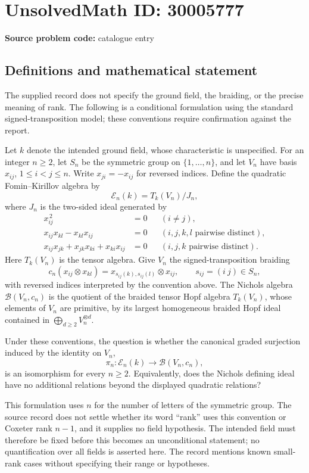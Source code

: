 \documentclass[11pt]{article}
\begin{document}
\section*{UnsolvedMath ID: 30005777}
\textbf{Source problem code:} catalogue entry
\subsection{Definitions and mathematical statement}
The supplied record does not specify the ground field, the braiding, or the precise meaning of rank. The following is a conditional formulation using the standard signed-transposition model; these conventions require confirmation against the report.

Let \(k\) denote the intended ground field, whose characteristic is unspecified. For an integer \(n\geq 2\), let \(S_n\) be the symmetric group on \(\{1,\ldots,n\}\), and let \(V_n\) have basis \(x_{ij}\), \(1\leq i<j\leq n\). Write \(x_{ji}=-x_{ij}\) for reversed indices. Define the quadratic Fomin--Kirillov algebra by
\[
\mathcal E_n(k)=T_k(V_n)/J_n,
\]
where \(J_n\) is the two-sided ideal generated by
\[
\begin{aligned}
 x_{ij}^{\,2}&=0 &&(i\ne j),\\
 x_{ij}x_{kl}-x_{kl}x_{ij}&=0 &&(i,j,k,l\text{ pairwise distinct}),\\
 x_{ij}x_{jk}+x_{jk}x_{ki}+x_{ki}x_{ij}&=0 &&(i,j,k\text{ pairwise distinct}).
\end{aligned}
\]
Here \(T_k(V_n)\) is the tensor algebra. Give \(V_n\) the signed-transposition braiding
\[
 c_n(x_{ij}\otimes x_{kl})
 =x_{s_{ij}(k),s_{ij}(l)}\otimes x_{ij},
 \qquad s_{ij}=(i\ j)\in S_n,
\]
with reversed indices interpreted by the convention above. The Nichols algebra \(\mathcal B(V_n,c_n)\) is the quotient of the braided tensor Hopf algebra \(T_k(V_n)\), whose elements of \(V_n\) are primitive, by its largest homogeneous braided Hopf ideal contained in \(\bigoplus_{d\geq2}V_n^{\otimes d}\).

Under these conventions, the question is whether the canonical graded surjection induced by the identity on \(V_n\),
\[
\pi_n:\mathcal E_n(k)\longrightarrow\mathcal B(V_n,c_n),
\]
is an isomorphism for every \(n\geq2\). Equivalently, does the Nichols defining ideal have no additional relations beyond the displayed quadratic relations?

This formulation uses \(n\) for the number of letters of the symmetric group. The source record does not settle whether its word ``rank'' uses this convention or Coxeter rank \(n-1\), and it supplies no field hypothesis. The intended field must therefore be fixed before this becomes an unconditional statement; no quantification over all fields is asserted here. The record mentions known small-rank cases without specifying their range or hypotheses.
\end{document}
